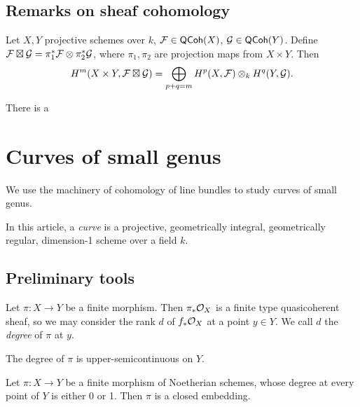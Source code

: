 \documentclass[11pt]{amsart}
\begin{document}
\subsection{Remarks on sheaf cohomology}

\begin{thm}
    Let $X,Y$ projective schemes over $k$, $\mathcal{F}\in \mathsf{QCoh}(X)$, $\mathcal{G}\in \mathsf{QCoh}(Y)$. Define $\mathcal{F}\boxtimes \mathcal{G} = \pi_1^\ast \mathcal{F}\otimes \pi_2^\ast \mathcal{G}$, where $\pi_1,\pi_2$ are projection maps from $X\times Y$. Then
    \[H^m(X\times Y, \mathcal{F}\boxtimes \mathcal{G}) = \bigoplus_{p+q=m} H^p(X, \mathcal{F})\otimes_k H^q(Y, \mathcal{G}).\]
\end{thm}

\begin{thm}
    There is a 
\end{thm}



\section{Curves of small genus}

We use the machinery of cohomology of line bundles to study curves of small genus. 

\begin{defn}
In this article, a \emph{curve} is a projective, geometrically integral, geometrically regular, dimension-1 scheme over a field $k$.
\end{defn}


\subsection{Preliminary tools}

\begin{defn}
Let $\pi:X\to Y$ be a finite morphism. Then $\pi_\ast \mathcal{O}_X$ is a finite type quasicoherent sheaf, so we may consider the rank $d$ of $f_\ast\mathcal{O}_X$ at a point $y\in Y$. We call $d$ the \emph{degree} of $\pi$ at $y$.
\end{defn}

\begin{Rem}
The degree of $\pi$ is upper-semicontinuous on $Y$.
\end{Rem}

\begin{lem}
Let $\pi:X\to Y$ be a finite morphism of Noetherian schemes, whose degree at every point of $Y$ is either 0 or 1. Then $\pi$ is a closed embedding.
\end{lem}
\end{document}
